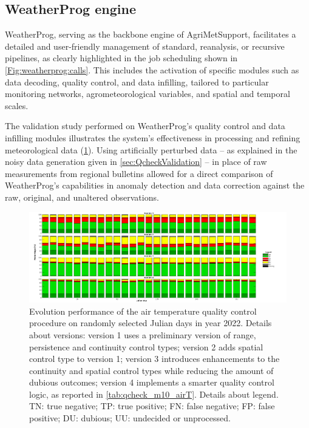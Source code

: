 \documentclass[authoryear,preprint,review,12pt]{elsarticle}
\begin{document}
\subsection{WeatherProg engine}
WeatherProg, serving as the backbone engine of AgriMetSupport, facilitates a detailed and user-friendly management of standard, reanalysis, or recursive pipelines, as clearly highlighted in the job scheduling shown in \cref{Fig:weatherprog:calls}.
This includes the activation of specific modules such as data decoding, quality control, and data infilling, tailored to particular monitoring networks, agrometeorological variables, and spatial and temporal scales.

The validation study performed on WeatherProg's quality control and data infilling modules illustrates the system's effectiveness in processing and refining meteorological data (\cref{fig:perturbationCharts}).
Using artificially perturbed data -- as explained in the noisy data generation given in \cref{sec:QcheckValidation} -- in place of raw measurements from regional bulletins allowed for a direct comparison of WeatherProg's capabilities in anomaly detection and data correction against the raw, original, and unaltered observations.

\begin{figure}
	\centering
	\includegraphics[scale=.30]{Fig09_qck_versions_v2.tif}
	\caption{ Evolution performance of the air temperature quality control procedure on randomly selected Julian days in year 2022.
    Details about versions: version 1 uses a preliminary version of range, persistence and continuity control types; version 2 adds spatial control type to version 1; version 3 introduces enhancements to the continuity and spatial control types while reducing the amount of dubious outcomes; version 4 implements a smarter quality control logic, as reported in \cref{tab:qcheck_m10_airT}.
    Details about legend. TN: true negative; TP: true positive; FN: false negative; FP: false positive; DU: dubious; UU: undecided or unprocessed. }
	\label{fig:perturbationCharts}
\end{figure}
\end{document}
